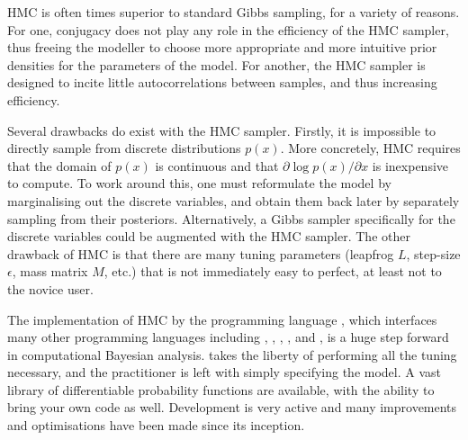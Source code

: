 HMC is often times superior to standard Gibbs sampling, for a variety of reasons. 
For one, conjugacy does not play any role in the efficiency of the HMC sampler, thus freeing the modeller to choose more appropriate and more intuitive prior densities for the parameters of the model. 
For another, the HMC sampler is designed to incite little autocorrelations between samples, and thus increasing efficiency.

Several drawbacks do exist with the HMC sampler. Firstly, it is impossible to directly sample from discrete distributions $p(x)$.
More concretely, HMC requires that the domain of $p(x)$ is continuous and that $\partial \log p(x) / \partial x$ is inexpensive to compute.
To work around this, one must reformulate the model by marginalising out the discrete variables, and obtain them back later by separately sampling from their posteriors.
Alternatively, a Gibbs sampler specifically for the discrete variables could be augmented with the HMC sampler.
The other drawback of HMC is that there are many tuning parameters (leapfrog $L$, step-size $\epsilon$, mass matrix $M$, etc.)  that is not immediately easy to perfect, at least not to the novice user. 

The implementation of HMC by the programming language , which interfaces many other programming languages including , , , ,  and , is a huge step forward in computational Bayesian analysis.
 takes the liberty of performing all the tuning necessary, and the practitioner is left with simply specifying the model. 
A vast library of differentiable probability functions are available, with the ability to bring your own code as well.
Development is very active and many improvements and optimisations have been made since its inception.

